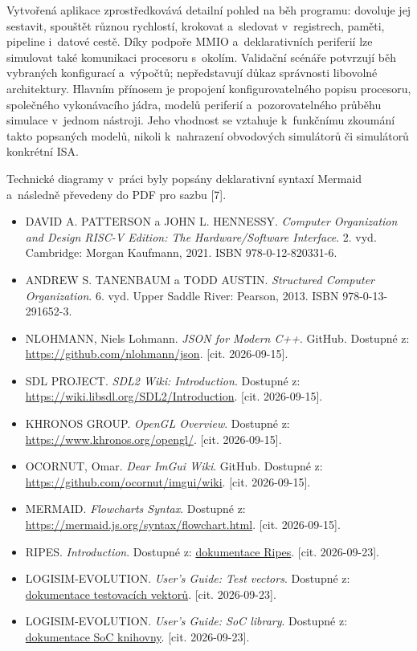 \documentclass[hidelinks, 12pt]{article}%
\begin{document}
Vytvořená aplikace zprostředkovává detailní pohled na běh programu: dovoluje jej sestavit, spouštět různou rychlostí, krokovat a~sledovat v~registrech, paměti, pipeline i~datové cestě. Díky podpoře MMIO a~deklarativních periferií lze simulovat také komunikaci procesoru s~okolím. Validační scénáře potvrzují běh vybraných konfigurací a~výpočtů; nepředstavují důkaz správnosti libovolné architektury. Hlavním přínosem je propojení konfigurovatelného popisu procesoru, společného vykonávacího jádra, modelů periferií a~pozorovatelného průběhu simulace v~jednom nástroji. Jeho vhodnost se vztahuje k~funkčnímu zkoumání takto popsaných modelů, nikoli k~nahrazení obvodových simulátorů či simulátorů konkrétní ISA.

Technické diagramy v~práci byly popsány deklarativní syntaxí Mermaid a~následně převedeny do PDF pro sazbu [7].

\begin{itemize}
\item[1.] DAVID A. PATTERSON a JOHN L. HENNESSY. \textit{Computer Organization and Design RISC-V Edition: The Hardware/Software Interface}. 2. vyd. Cambridge: Morgan Kaufmann, 2021. ISBN 978-0-12-820331-6.
\item[2.] ANDREW S. TANENBAUM a TODD AUSTIN. \textit{Structured Computer Organization}. 6. vyd. Upper Saddle River: Pearson, 2013. ISBN 978-0-13-291652-3.
\item[3.] NLOHMANN, Niels Lohmann. \textit{JSON for Modern C++}. GitHub. Dostupné z: \url{https://github.com/nlohmann/json}. [cit. 2026-09-15].
\item[4.] SDL PROJECT. \textit{SDL2 Wiki: Introduction}. Dostupné z: \url{https://wiki.libsdl.org/SDL2/Introduction}. [cit. 2026-09-15].
\item[5.] KHRONOS GROUP. \textit{OpenGL Overview}. Dostupné z: \url{https://www.khronos.org/opengl/}. [cit. 2026-09-15].
\item[6.] OCORNUT, Omar. \textit{Dear ImGui Wiki}. GitHub. Dostupné z: \url{https://github.com/ocornut/imgui/wiki}. [cit. 2026-09-15].
\item[7.] MERMAID. \textit{Flowcharts Syntax}. Dostupné z: \url{https://mermaid.js.org/syntax/flowchart.html}. [cit. 2026-09-15].
\item[8.] RIPES. \textit{Introduction}. Dostupné z: \href{https://github.com/mortbopet/Ripes/blob/master/docs/introduction.md}{dokumentace Ripes}. [cit. 2026-09-23].
\item[9.] LOGISIM-EVOLUTION. \textit{User's Guide: Test vectors}. Dostupné z: \href{https://mbaillif.github.io/Logisim-evolution-documentation/en/html/guide/verify/test.html}{dokumentace testovacích vektorů}. [cit. 2026-09-23].
\item[10.] LOGISIM-EVOLUTION. \textit{User's Guide: SoC library}. Dostupné z: \href{https://mbaillif.github.io/Logisim-evolution-documentation/en/html/libs/soc/index.html}{dokumentace SoC knihovny}. [cit. 2026-09-23].
\end{itemize}
\end{document}
